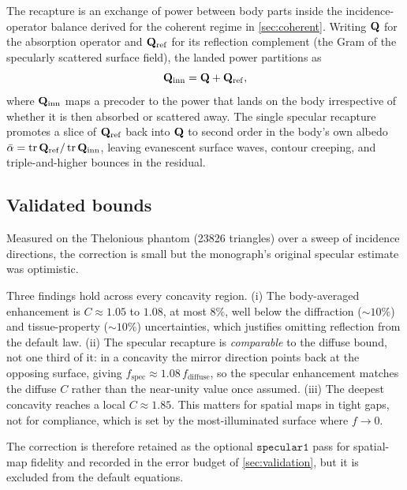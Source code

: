 The recapture is an exchange of power between body parts inside the
incidence-operator balance derived for the coherent regime in
\cref{sec:coherent}. Writing $\mathbf{Q}$ for the absorption operator and
$\mathbf{Q}_{\mathrm{ref}}$ for its reflection complement (the Gram of the
specularly scattered surface field), the landed power partitions as
\begin{equation}\label{eq:op-balance}
  \mathbf{Q}_{\mathrm{inn}}=\mathbf{Q}+\mathbf{Q}_{\mathrm{ref}},
\end{equation}
where $\mathbf{Q}_{\mathrm{inn}}$ maps a precoder to the power that lands on
the body irrespective of whether it is then absorbed or scattered
away. The single specular recapture promotes a slice of
$\mathbf{Q}_{\mathrm{ref}}$ back into $\mathbf{Q}$ to second order in the body's
own albedo $\bar\alpha=\operatorname{tr}\mathbf{Q}_{\mathrm{ref}}/
\operatorname{tr}\mathbf{Q}_{\mathrm{inn}}$, leaving evanescent surface
waves, contour creeping, and triple-and-higher bounces in the
residual.

\subsection{Validated bounds}

Measured on the Thelonious phantom (\num{23826} triangles) over a sweep
of incidence directions, the correction is small but the monograph's
original specular estimate was optimistic.

\begin{remark}\label{rem:interbody-data}
Three findings hold across every concavity region.
(i) The body-averaged enhancement is $C\approx 1.05$ to $1.08$, at most
$8\%$, well below the diffraction (${\sim}10\%$) and tissue-property
(${\sim}10\%$) uncertainties, which justifies omitting reflection from
the default law.
(ii) The specular recapture is \emph{comparable} to the diffuse bound,
not one third of it: in a concavity the mirror direction points back
at the opposing surface, giving
$f_{\mathrm{spec}}\approx 1.08\,f_{\mathrm{diffuse}}$, so the specular
enhancement matches the diffuse $C$ rather than the near-unity value
once assumed.
(iii) The deepest concavity reaches a local $C\approx 1.85$. This
matters for spatial maps in tight gaps, not for compliance, which is
set by the most-illuminated surface where $f\to 0$.
\end{remark}

The correction is therefore retained as the optional
$\mathtt{specular1}$ pass for spatial-map fidelity and recorded in the
error budget of \cref{sec:validation}, but it is excluded from the
default equations.
